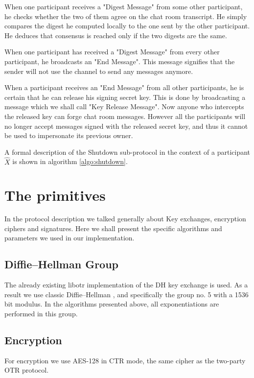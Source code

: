 When one participant receives a "Digest Message" from some other participant, he checks whether the two of them agree on the chat room transcript. He simply compares the digest he computed locally to the one sent by the other participant. He deduces that consensus is reached only if the two digests are the same.

When one participant has received a "Digest Message" from every other participant, he broadcasts an "End Message". This message signifies that the sender will not use the channel to send any messages anymore.

When a participant receives an "End Message" from all other participants, he is certain that he can release his signing secret key. This is done by broadcasting a message which we shall call "Key Release Message". Now anyone who intercepts the released key can forge chat room messages. However all the participants will no longer accept messages signed with the released secret key, and thus it cannot be used to impersonate its previous owner.

A formal description of the Shutdown sub-protocol in the context of a participant $\hat{X}$ is shown in algorithm \ref{algo:shutdown}.

\section{The primitives}
\label{setions:Protocol:primitives}
In the protocol description we talked generally about \dhname Key exchanges, encryption ciphers and signatures.
Here we shall present the specific algorithms and parameters we used in our implementation.

\subsection{Diffie--Hellman Group}
The already existing libotr implementation of the DH key exchange is used.
As a result we use classic Diffie--Hellman , and specifically the group no. 5 \cite{website:dh-rfc} with a 1536 bit modulus.
In the algorithms presented above, all exponentiations are performed in this group.

\subsection{Encryption}

For encryption we use AES-128 in CTR mode, the same cipher as the two-party OTR protocol.

